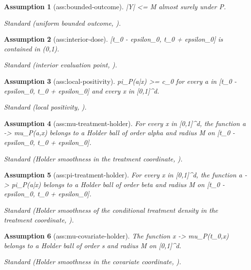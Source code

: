 \documentclass{article}
\newtheorem{assumption}{Assumption}
\begin{document}
\begin{assumption}[ass:bounded-outcome]\label{ass:bounded-outcome}
|Y| <= M almost surely under P.
\par\smallskip\noindent\emph{Standard} (uniform bounded outcome, \cite{BonviniKennedy2022FastDRF}).
\end{assumption}

\begin{assumption}[ass:interior-dose]\label{ass:interior-dose}
[t_0 - epsilon_0, t_0 + epsilon_0] is contained in (0,1).
\par\smallskip\noindent\emph{Standard} (interior evaluation point, \cite{ColangeloLee2020ContinuousDML}).
\end{assumption}

\begin{assumption}[ass:local-positivity]\label{ass:local-positivity}
pi_P(a|x) >= c_0 for every a in [t_0 - epsilon_0, t_0 + epsilon_0] and every x in [0,1]^d.
\par\smallskip\noindent\emph{Standard} (local positivity, \cite{BonviniKennedy2022FastDRF}).
\end{assumption}

\begin{assumption}[ass:mu-treatment-holder]\label{ass:mu-treatment-holder}
For every x in [0,1]^d, the function a -> mu_P(a,x) belongs to a Holder ball of order alpha and radius M on [t_0 - epsilon_0, t_0 + epsilon_0].
\par\smallskip\noindent\emph{Standard} (Holder smoothness in the treatment coordinate, \cite{Tsybakov2009Nonparametric}).
\end{assumption}

\begin{assumption}[ass:pi-treatment-holder]\label{ass:pi-treatment-holder}
For every x in [0,1]^d, the function a -> pi_P(a|x) belongs to a Holder ball of order beta and radius M on [t_0 - epsilon_0, t_0 + epsilon_0].
\par\smallskip\noindent\emph{Standard} (Holder smoothness of the conditional treatment density in the treatment coordinate, \cite{BonviniKennedy2022FastDRF}).
\end{assumption}

\begin{assumption}[ass:mu-covariate-holder]\label{ass:mu-covariate-holder}
The function x -> mu_P(t_0,x) belongs to a Holder ball of order s and radius M on [0,1]^d.
\par\smallskip\noindent\emph{Standard} (Holder smoothness in the covariate coordinate, \cite{Tsybakov2009Nonparametric}).
\end{assumption}
\end{document}
